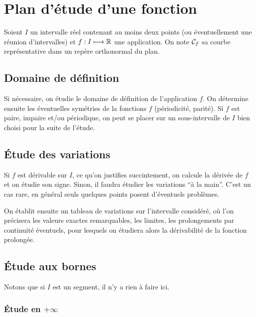 \chapter{Plan d'étude d'une fonction}

Soient $I$ un intervalle réel contenant au moins deux points (ou éventuellement une réunion d'intervalles) et $f : I \longmapsto \mathbb{R}$ une application. On note $\mathcal{C}_f$ sa courbe représentative dans un repère orthonormal du plan.

\section{Domaine de définition}

Si nécessaire, on étudie le domaine de définition de l'application $f$. On détermine ensuite les éventuelles symétries de la fonctions $f$ (périodicité, parité). Si $f$ est paire, impaire et/ou périodique, on peut se placer sur un sous-intervalle de $I$ bien choisi pour la suite de l'étude.

\section{Étude des variations}

Si $f$ est dérivable sur $I$, ce qu'on justifies succintement, on calcule la dérivée de $f$ et on étudie son signe. Sinon, il faudra étudier les variations ``à la main''. C'est un cas rare, en général seuls quelques points posent d'éventuels problèmes.

On établit ensuite un tableau de variations sur l'intervalle considéré, où l'on précisera les valeurs exactes remarquables, les limites, les prolongements par continuité éventuels, pour lesquels on étudiera alors la dérivabilité de la fonction prolongée.

\section{Étude aux bornes}

Notons que si $I$ est un segment, il n'y a rien à faire ici.

\subsection{Étude en $+\infty$}

